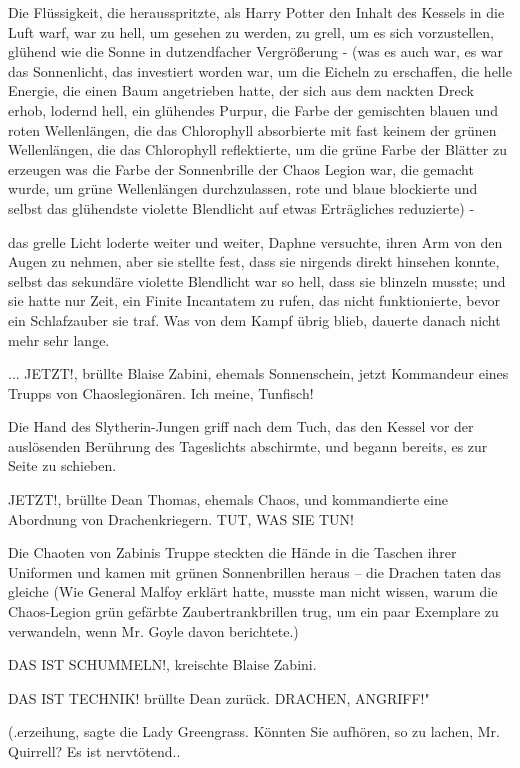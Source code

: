 Die Flüssigkeit, die herausspritzte, als Harry Potter den Inhalt des Kessels in
die Luft warf, war zu hell, um gesehen zu werden, zu grell, um es sich
vorzustellen, glühend wie die Sonne in dutzendfacher Vergrößerung - (was es auch
war, es war das Sonnenlicht, das investiert worden war, um die Eicheln zu
erschaffen, die helle Energie, die einen Baum angetrieben hatte, der sich aus
dem nackten Dreck erhob, lodernd hell, ein glühendes Purpur, die Farbe der
gemischten blauen und roten Wellenlängen, die das Chlorophyll absorbierte mit
fast keinem der grünen Wellenlängen, die das Chlorophyll reflektierte, um die
grüne Farbe der Blätter zu erzeugen was die Farbe der Sonnenbrille der Chaos
Legion war, die gemacht wurde, um grüne Wellenlängen durchzulassen, rote und
blaue blockierte und selbst das glühendste violette Blendlicht auf etwas
Erträgliches reduzierte) -

das grelle Licht loderte weiter und weiter, Daphne versuchte, ihren Arm von den
Augen zu nehmen, aber sie stellte fest, dass sie nirgends direkt hinsehen
konnte, selbst das sekundäre violette Blendlicht war so hell, dass sie blinzeln
musste; und sie hatte nur Zeit, ein Finite Incantatem zu rufen, das nicht
funktionierte, bevor ein Schlafzauber sie traf. Was von dem Kampf übrig blieb,
dauerte danach nicht mehr sehr lange.

... \glqq{}JETZT!\grqq{}, brüllte Blaise Zabini, ehemals Sonnenschein, jetzt
Kommandeur eines Trupps von Chaoslegionären. \glqq{}Ich meine, Tunfisch!\grqq{}

Die Hand des Slytherin-Jungen griff nach dem Tuch, das den Kessel vor der
auslösenden Berührung des Tageslichts abschirmte, und begann bereits, es zur
Seite zu schieben.

\glqq{}JETZT!\grqq{}, brüllte Dean Thomas, ehemals Chaos, und kommandierte eine
Abordnung von Drachenkriegern. \glqq{}TUT, WAS SIE TUN!\grqq{}

Die Chaoten von Zabinis Truppe steckten die Hände in die Taschen ihrer Uniformen
und kamen mit grünen Sonnenbrillen heraus – die Drachen taten das gleiche (Wie
General Malfoy erklärt hatte, musste man nicht wissen, warum die Chaos-Legion
grün gefärbte Zaubertrankbrillen trug, um ein paar Exemplare zu verwandeln, wenn
Mr. Goyle davon berichtete.)

\glqq{}DAS IST SCHUMMELN!\grqq{}, kreischte Blaise Zabini.

\glqq{}DAS IST TECHNIK!\grqq{} brüllte Dean zurück. \glqq{}DRACHEN, ANGRIFF!"

(\grqq{}.erzeihung\grqq{}, sagte die Lady Greengrass. \glqq{}Könnten Sie
aufhören, so zu lachen, Mr. Quirrell? Es ist nervtötend.\grqq{}.

